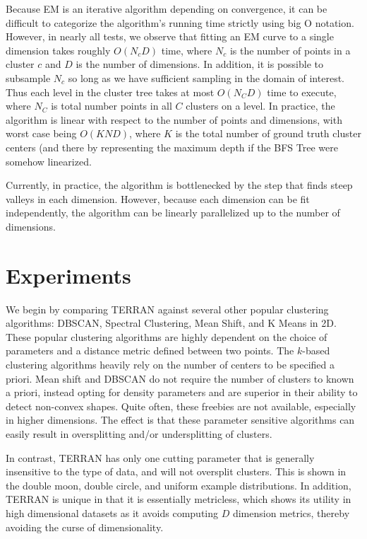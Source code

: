 \documentclass{acm_proc_article-sp}
\begin{document}
Because EM is an iterative algorithm depending on convergence, it can be difficult to categorize the algorithm's running time strictly using big O notation. However, in nearly all tests, we observe that fitting an EM curve to a single dimension takes roughly $O(N_c D)$ time, where $N_c$ is the number of points in a cluster $c$ and $D$ is the number of dimensions. In addition, it is possible to subsample $N_c$ so long as we have sufficient sampling in the domain of interest. Thus each level in the cluster tree takes at most $O(N_C D)$ time to execute, where $N_C$ is total number points in all $C$ clusters on a level. In practice, the algorithm is linear with respect to the number of points and dimensions, with worst case being $O(K N D)$, where $K$ is the total number of ground truth cluster centers (and there by representing the maximum depth if the BFS Tree were somehow linearized. 

Currently, in practice, the algorithm is bottlenecked by the step that finds steep valleys in each dimension. However, because each dimension can be fit independently, the algorithm can be linearly parallelized up to the number of dimensions. 

\section{Experiments}

We begin by comparing TERRAN against several other popular clustering algorithms: DBSCAN, Spectral Clustering, Mean Shift, and K Means in 2D. These popular clustering algorithms are highly dependent on the choice of parameters and a distance metric defined between two points. The $k$-based clustering algorithms heavily rely on the number of centers to be specified a priori. Mean shift and DBSCAN do not require the number of clusters to known a priori, instead opting for density parameters and are superior in their ability to detect non-convex shapes. Quite often, these freebies are not available, especially in higher dimensions. The effect is that these parameter sensitive algorithms can easily result in oversplitting and/or undersplitting of clusters. 

In contrast, TERRAN has only one cutting parameter that is generally insensitive to the type of data, and will not oversplit clusters. This is shown in the double moon, double circle, and uniform example distributions. In addition, TERRAN is unique in that it is essentially metricless, which shows its utility in high dimensional datasets as it avoids computing $D$ dimension metrics, thereby avoiding the curse of dimensionality.
\end{document}
